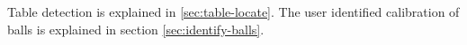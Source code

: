 Table detection is explained in \ref{sec:table-locate}. The user identified calibration of balls is explained in section \ref{sec:identify-balls}.\\                                                                                                                                                                                                                                                                                                                                                                                                                                                                                                                                                                                                                                                                                                                                                                                                                                                                                                                                                                                                                                                                                                                                                                                                                                                                                                                                                                                                                                                                                                                                                                                                                                                                                                                                                                                                                                                                                                                                                                                                                                                                                                                                                                                                                                                                                                                                                                                                                                                                                                                                                                                                                                                                                                                                                                                                                                                                                                                                                                                                                                                                                                                                                                                                                                                    